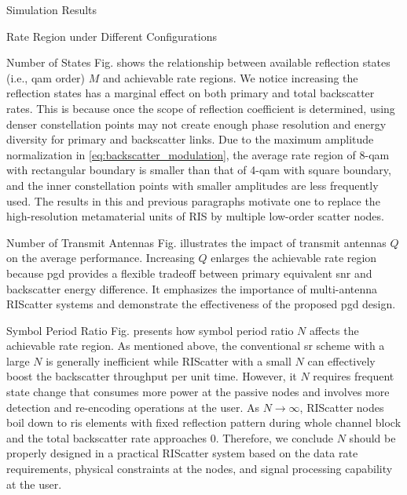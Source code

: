 \documentclass[journal]{IEEEtran}
\begin{document}
\begin{section}{Simulation Results}
\begin{subsection}{Rate Region under Different Configurations}
		\begin{subsubsection}{Number of States}
			Fig.  shows the relationship between available reflection states (i.e., \gls{qam} order) $M$ and achievable rate regions.
			We notice increasing the reflection states has a marginal effect on both primary and total backscatter rates.
			This is because once the scope of reflection coefficient is determined, using denser constellation points may not create enough phase resolution and energy diversity for primary and backscatter links.
			Due to the maximum amplitude normalization in \eqref{eq:backscatter_modulation}, the average rate region of \num{8}-\gls{qam} with rectangular boundary is smaller than that of \num{4}-\gls{qam} with square boundary, and the inner constellation points with smaller amplitudes are less frequently used.
			The results in this and previous paragraphs motivate one to replace the high-resolution metamaterial units of RIS by multiple low-order scatter nodes.
		\end{subsubsection}

		\begin{subsubsection}{Number of Transmit Antennas}
			Fig.  illustrates the impact of transmit antennas $Q$ on the average performance.
			Increasing $Q$ enlarges the achievable rate region because \gls{pgd} provides a flexible tradeoff between primary equivalent \gls{snr} and backscatter energy difference.
			It emphasizes the importance of multi-antenna RIScatter systems and demonstrate the effectiveness of the proposed \gls{pgd} design.
		\end{subsubsection}

		\begin{subsubsection}{Symbol Period Ratio}
			Fig.  presents how symbol period ratio $N$ affects the achievable rate region.
			As mentioned above, the conventional \gls{sr} scheme with a large $N$ is generally inefficient while RIScatter with a small $N$ can effectively boost the backscatter throughput per unit time.
			However, it $N$ requires frequent state change that consumes more power at the passive nodes and involves more detection and re-encoding operations at the user.
			As $N \to \infty$, RIScatter nodes boil down to \gls{ris} elements with fixed reflection pattern during whole channel block and the total backscatter rate approaches \num{0}.
			Therefore, we conclude $N$ should be properly designed in a practical RIScatter system based on the data rate requirements, physical constraints at the nodes, and signal processing capability at the user.
		\end{subsubsection}


\end{subsection}
\end{section}
\end{document}
